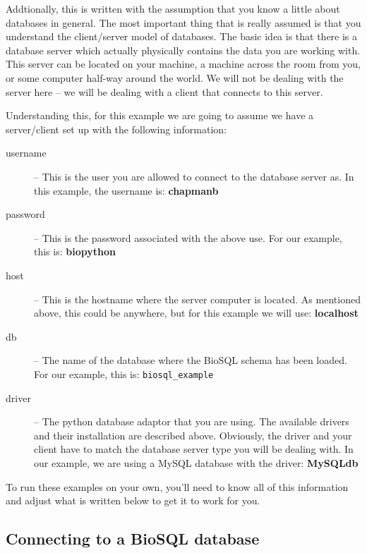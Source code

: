 \documentclass{article}
\begin{document}
Addtionally, this is written with the assumption that you know a little
about databases in general. The most important thing that is really
assumed is that you understand the client/server model of databases. The
basic idea is that there is a database server which actually physically
contains the data you are working with. This server can be located on
your machine, a machine across the room from you, or some computer
half-way around the world. We will not be dealing with the server here
-- we will be dealing with a client that connects to this server. 


Understanding this, for this example we are going to assume we have a
server/client set up with the following information:

\begin{description}
  \item[username] -- This is the user you are allowed to connect to the
  database server as. In this example, the username is:
  \textbf{chapmanb}

  \item[password] -- This is the password associated with the above use.
  For our example, this is: \textbf{biopython}

  \item[host] -- This is the hostname where the server computer is
  located. As mentioned above, this could be anywhere, but for this
  example we will use: \textbf{localhost}

  \item[db] -- The name of the database where the BioSQL schema has been
  loaded. For our example, this is: \verb|biosql_example|

  \item[driver] -- The python database adaptor that you are using. The
  available drivers and their installation are described above.
  Obviously, the driver and your client have to match the database
  server type you will be dealing with. In our example, we are using a
  MySQL database with the driver: \textbf{MySQLdb}
  
\end{description}

To run these examples on your own, you'll need to know all of this
information and adjust what is written below to get it to work for you.

\subsection{Connecting to a BioSQL database}
\end{document}
